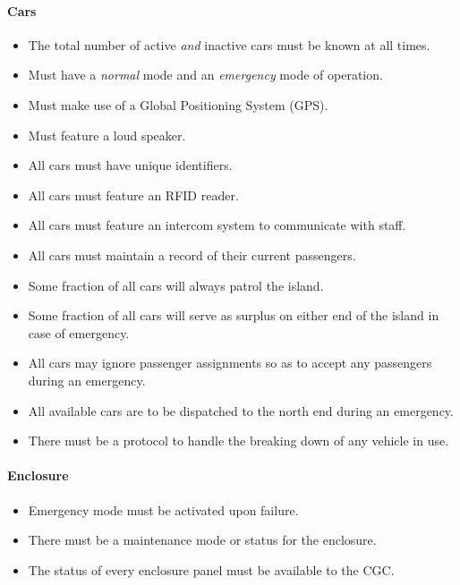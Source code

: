 \documentclass[12pt]{article}
\begin{document}
    \paragraph{Cars}
    \begin{itemize}
        \item[] The total number of active \textit{and} inactive cars must be known at all times.
        \item[] Must have a \textit{normal} mode and an \textit{emergency} mode of operation.
        \item[] Must make use of a Global Positioning System (GPS).
        \item[] Must feature a loud speaker.
        \item[] All cars must have unique identifiers.
        \item[] All cars must feature an RFID reader.
        \item[] All cars must feature an intercom system to communicate with staff.
        \item[] All cars must maintain a record of their current passengers.
        \item[] Some fraction of all cars will always patrol the island.
        \item[] Some fraction of all cars will serve as surplus on either end of the island in case of emergency.
        \item[] All cars may ignore passenger assignments so as to accept any passengers during an emergency.
        \item[] All available cars are to be dispatched to the north end during an emergency.
        \item[] There must be a protocol to handle the breaking down of any vehicle in use.
    \end{itemize}
    
    \paragraph{Enclosure}
    \begin{itemize}
        \item[] Emergency mode must be activated upon failure.
        \item[] There must be a maintenance mode or status for the enclosure.
        \item[] The status of every enclosure panel must be available to the CGC. 
    \end{itemize}
    
\end{document}
